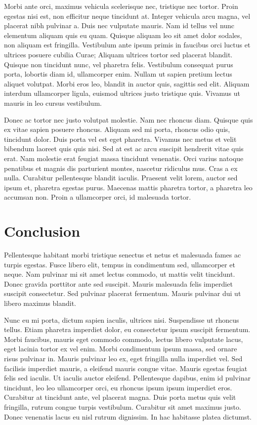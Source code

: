 \documentclass{article}
\begin{document}
        Morbi ante orci, maximus vehicula scelerisque nec, tristique nec tortor. Proin egestas nisi est, non efficitur neque tincidunt at. Integer vehicula arcu magna, vel placerat nibh pulvinar a. Duis nec vulputate mauris. Nam id tellus vel nunc elementum aliquam quis eu quam. Quisque aliquam leo sit amet dolor sodales, non aliquam est fringilla. Vestibulum ante ipsum primis in faucibus orci luctus et ultrices posuere cubilia Curae; Aliquam ultrices tortor sed placerat blandit. Quisque non tincidunt nunc, vel pharetra felis. Vestibulum consequat purus porta, lobortis diam id, ullamcorper enim. Nullam ut sapien pretium lectus aliquet volutpat. Morbi eros leo, blandit in auctor quis, sagittis sed elit. Aliquam interdum ullamcorper ligula, euismod ultrices justo tristique quis. Vivamus ut mauris in leo cursus vestibulum.
        
        Donec ac tortor nec justo volutpat molestie. Nam nec rhoncus diam. Quisque quis ex vitae sapien posuere rhoncus. Aliquam sed mi porta, rhoncus odio quis, tincidunt dolor. Duis porta vel est eget pharetra. Vivamus nec metus et velit bibendum laoreet quis quis nisi. Sed at est ac arcu suscipit hendrerit vitae quis erat. Nam molestie erat feugiat massa tincidunt venenatis. Orci varius natoque penatibus et magnis dis parturient montes, nascetur ridiculus mus. Cras a ex nulla. Curabitur pellentesque blandit iaculis. Praesent velit lorem, auctor sed ipsum et, pharetra egestas purus. Maecenas mattis pharetra tortor, a pharetra leo accumsan non. Proin a ullamcorper orci, id malesuada tortor.

    \section{Conclusion}

        Pellentesque habitant morbi tristique senectus et netus et malesuada fames ac turpis egestas. Fusce libero elit, tempus in condimentum sed, ullamcorper et neque. Nam pulvinar mi sit amet lectus commodo, ut mattis velit tincidunt. Donec gravida porttitor ante sed suscipit. Mauris malesuada felis imperdiet suscipit consectetur. Sed pulvinar placerat fermentum. Mauris pulvinar dui ut libero maximus blandit.
        
        Nunc eu mi porta, dictum sapien iaculis, ultrices nisi. Suspendisse ut rhoncus tellus. Etiam pharetra imperdiet dolor, eu consectetur ipsum suscipit fermentum. Morbi faucibus, mauris eget commodo commodo, lectus libero vulputate lacus, eget lacinia tortor ex vel enim. Morbi condimentum ipsum massa, sed ornare risus pulvinar in. Mauris pulvinar leo ex, eget fringilla nulla imperdiet vel. Sed facilisis imperdiet mauris, a eleifend mauris congue vitae. Mauris egestas feugiat felis sed iaculis. Ut iaculis auctor eleifend. Pellentesque dapibus, enim id pulvinar tincidunt, leo leo ullamcorper orci, eu rhoncus ipsum ipsum imperdiet eros. Curabitur at tincidunt ante, vel placerat magna. Duis porta metus quis velit fringilla, rutrum congue turpis vestibulum. Curabitur sit amet maximus justo. Donec venenatis lacus eu nisl rutrum dignissim. In hac habitasse platea dictumst.
\end{document}
